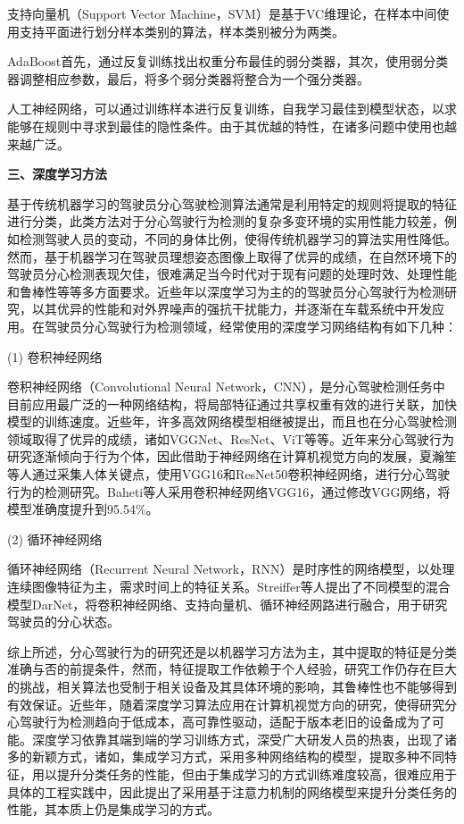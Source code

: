 支持向量机（Support Vector Machine，SVM）是基于VC维理论，在样本中间使用支持平面进行划分样本类别的算法，样本类别被分为两类。

AdaBoost首先，通过反复训练找出权重分布最佳的弱分类器，其次，使用弱分类器调整相应参数，最后，将多个弱分类器将整合为一个强分类器。

人工神经网络，可以通过训练样本进行反复训练，自我学习最佳到模型状态，以求能够在规则中寻求到最佳的隐性条件。由于其优越的特性，在诸多问题中使用也越来越广泛。


\textbf{三、深度学习方法}

基于传统机器学习的驾驶员分心驾驶检测算法通常是利用特定的规则将提取的特征进行分类，此类方法对于分心驾驶行为检测的复杂多变环境的实用性能力较差，例如检测驾驶人员的变动，不同的身体比例，使得传统机器学习的算法实用性降低。然而，基于机器学习在驾驶员理想姿态图像上取得了优异的成绩，在自然环境下的驾驶员分心检测表现欠佳，很难满足当今时代对于现有问题的处理时效、处理性能和鲁棒性等等多方面要求。近些年以深度学习为主的的驾驶员分心驾驶行为检测研究，以其优异的性能和对外界噪声的强抗干扰能力，并逐渐在车载系统中开发应用。在驾驶员分心驾驶行为检测领域，经常使用的深度学习网络结构有如下几种：

(1)	卷积神经网络

卷积神经网络（Convolutional Neural Network，CNN），是分心驾驶检测任务中目前应用最广泛的一种网络结构，将局部特征通过共享权重有效的进行关联，加快模型的训练速度。近些年，许多高效网络模型相继被提出，而且也在分心驾驶检测领域取得了优异的成绩，诸如VGGNet、ResNet、ViT等等。近年来分心驾驶行为研究逐渐倾向于行为个体，因此借助于神经网络在计算机视觉方向的发展，夏瀚笙等人\cite{30}通过采集人体关键点，使用VGG16和ResNet50卷积神经网络，进行分心驾驶行为的检测研究。Baheti等人\cite{31}采用卷积神经网络VGG16，通过修改VGG网络，将模型准确度提升到95.54\%。

(2)	循环神经网络


循环神经网络（Recurrent Neural Network，RNN）是时序性的网络模型，以处理连续图像特征为主，需求时间上的特征关系。Streiffer等人\cite{32}提出了不同模型的混合模型DarNet，将卷积神经网络、支持向量机、循环神经网路进行融合，用于研究驾驶员的分心状态。



综上所述，分心驾驶行为的研究还是以机器学习方法为主，其中提取的特征是分类准确与否的前提条件，然而，特征提取工作依赖于个人经验，研究工作仍存在巨大的挑战，相关算法也受制于相关设备及其具体环境的影响，其鲁棒性也不能够得到有效保证。近些年，随着深度学习算法应用在计算机视觉方向的研究，使得研究分心驾驶行为检测趋向于低成本，高可靠性驱动，适配于版本老旧的设备成为了可能。深度学习依靠其端到端的学习训练方式，深受广大研发人员的热衷，出现了诸多的新颖方式，诸如，集成学习方式，采用多种网络结构的模型，提取多种不同特征，用以提升分类任务的性能，但由于集成学习的方式训练难度较高，很难应用于具体的工程实践中，因此提出了采用基于注意力机制的网络模型来提升分类任务的性能，其本质上仍是集成学习的方式。

